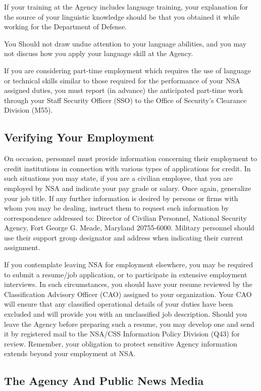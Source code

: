 \documentclass[a4]{article}
\begin{document}
If your training at the Agency includes language training, your explanation for
the source of your linguistic knowledge should be that you obtained it while
working for the Department of Defense.

You Should not draw undue attention to your language abilities, and you may not
discuss how you apply your language skill at the Agency.

If you are considering part-time employment which requires the use of language
or technical skills similar to those required for the performance of your NSA
assigned duties, you must report (in advance) the anticipated part-time work
through your Staff Security Officer (SSO) to the Office of Security's Clearance
Division (M55).

\subsection{Verifying Your Employment}

On occasion, personnel must provide information concerning their employment to
credit institutions in connection with various types of applications for
credit.  In such situations you may state, if you are a civilian employee,
that you are employed by NSA and indicate your pay grade or salary.  Once
again, generalize your job title.  If any further information is desired by
persons or firms with whom you may be dealing, instruct them to request such
information by correspondence addressed to: Director of Civilian Personnel,
National Security Agency, Fort George G. Meade, Maryland 20755-6000.  Military
personnel should use their support group designator and address when
indicating their current assignment.

If you contemplate leaving NSA for employment elsewhere, you may be required
to submit a resume/job application, or to participate in extensive employment
interviews.  In such circumstances, you should have your resume reviewed by
the Classification Advisory Officer (CAO) assigned to your organization.  Your
CAO will ensure that any classified operational details of your duties have
been excluded and will provide you with an unclassified job description.
Should you leave the Agency before preparing such a resume, you may develop
one and send it by registered mail to the NSA/CSS Information Policy Division
(Q43) for review.  Remember, your obligation to protect sensitive Agency
information extends beyond your employment at NSA.

\subsection{The Agency And Public News Media}
\end{document}
